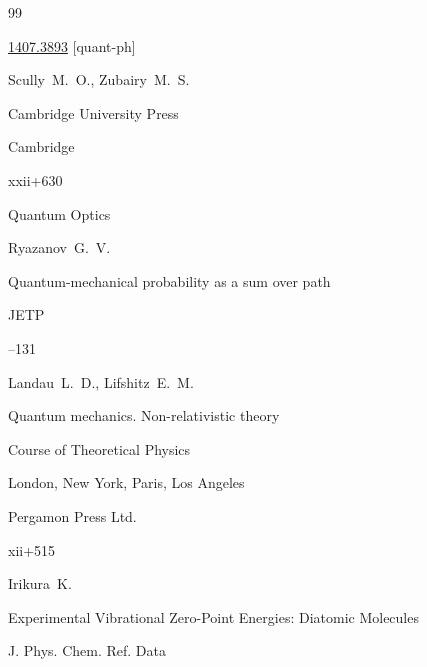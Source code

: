 \begin{thebibliography}{99}

\arxiv \href{http://arxiv.org/abs/1407.3893}{1407.3893} [quant-ph]







\by  Scully~M.~O., Zubairy~M.~S.

\publ Cambridge University Press

\publaddr Cambridge 



\totalpages xxii+630

\book Quantum Optics




\by Ryazanov~G.~V.

\paper Quantum-mechanical probability as a sum over path 

\jour JETP




--131




\by Landau~L.~D., Lifshitz~E.~M.

\volinfo Quantum mechanics. Non-relativistic theory

\book Course of Theoretical Physics


\publaddr London, New York, Paris, Los Angeles

\publ Pergamon Press Ltd.

\totalpages xii+515 






\by Irikura~K. 

\paper Experimental Vibrational Zero-Point Energies: Diatomic Molecules 

\jour J. Phys. Chem. Ref. Data





\end{thebibliography}
